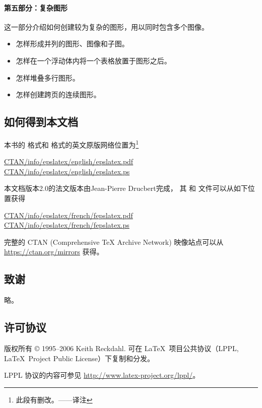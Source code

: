 \paragraph{第五部分：复杂图形}
这一部分介绍如何创建较为复杂的图形，用以同时包含多个图像。
\begin{itemize}
	\item 怎样形成并列的图形、图像和子图。
	\item 怎样在一个浮动体内将一个表格放置于图形之后。
	\item 怎样堆叠多行图形。
	\item 怎样创建跨页的连续图形。
\end{itemize}

\subsection*{如何得到本文档}
本书的 格式和 格式的英文原版网络位置为\footnote{
此段有删改。——译注}
\begin{center}
	\href{http://ctan.tug.org/tex-archive/info/epslatex/english/epslatex.pdf}{CTAN/info/epslatex/english/epslatex.pdf}\\
    \href{http://ctan.tug.org/tex-archive/info/epslatex/english/epslatex.ps}{CTAN/info/epslatex/english/epslatex.ps}
\end{center}
本文档版本2.0的法文版本由Jean-Pierre Drucbert完成，
其  和  文件可以从如下位置获得
\begin{center}
    \href{http://ctan.tug.org/tex-archive/info/epslatex/french/fepslatex.pdf}{CTAN/info/epslatex/french/fepslatex.pdf} \\
    \href{http://ctan.tug.org/tex-archive/info/epslatex/french/fepslatex.ps}{CTAN/info/epslatex/french/fepslatex.ps}
\end{center}
完整的 CTAN (Comprehensive \TeX{} Archive Network) 映像站点可以从 \url{https://ctan.org/mirrors} 获得。

\subsection*{致谢}
略。

\subsection*{许可协议}
版权所有 \copyright{} 1995--2006  Keith Reckdahl.
可在 \LaTeX\ 项目公共协议（LPPL, \LaTeX\ Project Public License）下复制和分发。

LPPL 协议的内容可参见 \url{http://www.latex-project.org/lppl/}。


\clearpage
\endinput
